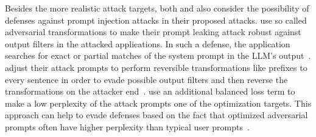 Besides the more realistic attack targets, both \hui and \shi also consider the possibility of defenses against prompt injection attacks in their proposed attacks.
\hui use so called adversarial transformations to make their prompt leaking attack robust against output filters in the attacked applications.
In such a defense, the application searches for exact or partial matches of the system prompt in the LLM's output~\cite{hui_pleak_2024}.
\hui adjust their attack prompts to perform reversible transformations like prefixes to every sentence in order to evade possible output filters and then reverse the transformations on the attacker end~\cite{hui_pleak_2024}.
\shi use an additional balanced loss term to make a low perplexity of the attack prompts one of the optimization targets.
This approach can help to evade defenses based on the fact that optimized adversarial prompts often have higher perplexity than typical user prompts~\cite{shi_optimization-based_2024}.